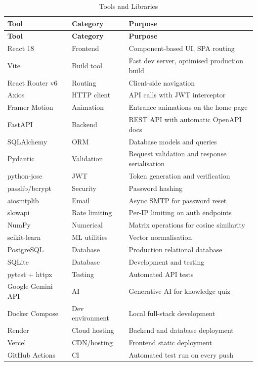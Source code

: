 \documentclass[12pt,a4paper]{report}
\begin{document}
\begin{longtable}{p{} p{} p{}}
\caption{Tools and Libraries}\label{tab:tools}\\
\toprule
\textbf{Tool} & \textbf{Category} & \textbf{Purpose} \\
\midrule
\endfirsthead
\toprule
\textbf{Tool} & \textbf{Category} & \textbf{Purpose} \\
\midrule
\endhead
React 18 & Frontend & Component-based UI, SPA routing \cite{react} \\
Vite & Build tool & Fast dev server, optimised production build \cite{vite} \\
React Router v6 & Routing & Client-side navigation \cite{reactrouter} \\
Axios & HTTP client & API calls with JWT interceptor \\
Framer Motion & Animation & Entrance animations on the home page \\
FastAPI & Backend & REST API with automatic OpenAPI docs \cite{fastapi} \\
SQLAlchemy & ORM & Database models and queries \cite{sqlalchemy} \\
Pydantic & Validation & Request validation and response serialisation \cite{pydantic} \\
python-jose & JWT & Token generation and verification \cite{ietfjwt} \\
passlib/bcrypt & Security & Password hashing \cite{passlib,provos1999} \\
aiosmtplib & Email & Async SMTP for password reset \cite{aiosmtplib} \\
slowapi & Rate limiting & Per-IP limiting on auth endpoints \\
NumPy & Numerical & Matrix operations for cosine similarity \cite{numpy} \\
scikit-learn & ML utilities & Vector normalisation \cite{sklearn} \\
PostgreSQL & Database & Production relational database \cite{postgresql} \\
SQLite & Database & Development and testing \cite{sqlite} \\
pytest + httpx & Testing & Automated API tests \\
Google Gemini API & AI & Generative AI for knowledge quiz \cite{gemini2024} \\
Docker Compose & Dev environment & Local full-stack development \cite{docker} \\
Render & Cloud hosting & Backend and database deployment \\
Vercel & CDN/hosting & Frontend static deployment \\
GitHub Actions & CI & Automated test run on every push \cite{githubactions} \\
\bottomrule
\end{longtable}
\end{document}
